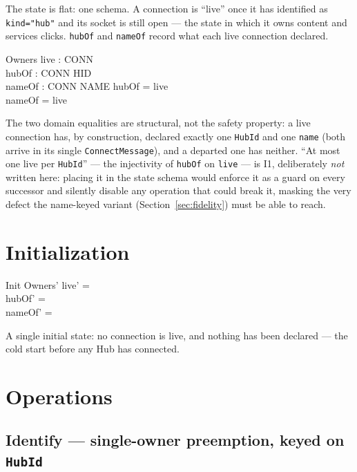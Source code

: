 \documentclass[a4paper,10pt,fleqn]{article}
\begin{document}
The state is flat: one schema.  A connection is ``live'' once it has
identified as \texttt{kind="hub"} and its socket is still open --- the
state in which it owns content and services clicks.  \texttt{hubOf} and
\texttt{nameOf} record what each live connection declared.

\begin{schema}{Owners}
  live : \power CONN \\
  hubOf : CONN \pfun HID \\
  nameOf : CONN \pfun NAME
\where
  \dom hubOf = live \\
  \dom nameOf = live
\end{schema}

The two domain equalities are structural, not the safety property: a live
connection has, by construction, declared exactly one \texttt{HubId} and
one \texttt{name} (both arrive in its single \texttt{ConnectMessage}), and
a departed one has neither.  ``At most one live per \texttt{HubId}'' ---
the injectivity of \texttt{hubOf} on \texttt{live} --- is I1, deliberately
\emph{not} written here: placing it in the state schema would enforce it
as a guard on every successor and silently disable any operation that
could break it, masking the very defect the name-keyed variant
(Section~\ref{sec:fidelity}) must be able to reach.

\section{Initialization}

\begin{schema}{Init}
  Owners'
\where
  live' = \emptyset \\
  hubOf' = \emptyset \\
  nameOf' = \emptyset
\end{schema}

A single initial state: no connection is live, and nothing has been
declared --- the cold start before any Hub has connected.

\section{Operations}

\subsection{Identify --- single-owner preemption, keyed on \texttt{HubId}}
\end{document}
